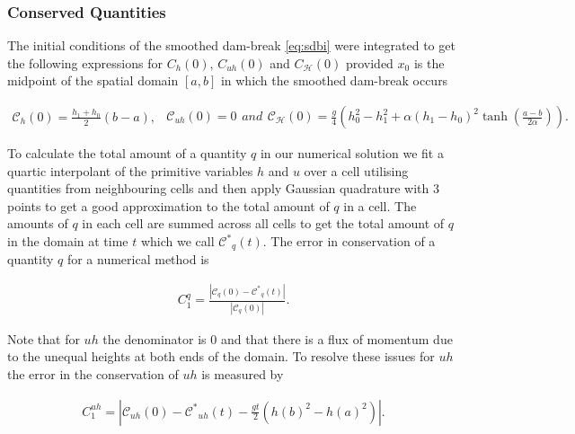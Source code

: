 \documentclass[times]{elsarticle}
\begin{document}
\subsubsection{Conserved Quantities}
The initial conditions of the smoothed dam-break \eqref{eq:sdbi} were integrated to get the following expressions for $C_{h}(0)$, $C_{uh}(0)$ and $C_{\mathcal{H}}(0)$ provided $x_0$ is the midpoint of the spatial domain $\left[a,b \right]$ in which the smoothed dam-break occurs
\begin{linenomath*}
	\begin{subequations}
		\begin{gather*}
		\mathcal{C}_{h}(0) = \frac{h_1 + h_0}{2}\left(b- a\right),
		\label{eq:Chdef}
		\end{gather*}
		\begin{gather*}
		\mathcal{C}_{uh}(0) = 0
		\label{eq:Cuhdef}
		\end{gather*}
		and
		\begin{gather*}
		\mathcal{C}_{\mathcal{H}}(0) = \frac{g}{4} \left(h_0^2 - h_1^2 + \alpha\left(h_1 - h_0\right)^2\tanh\left(\frac{a - b}{2 \alpha}\right)\right).
		\label{eq:CHdef}
		\end{gather*}
		\label{eq:Canalyticvalues}	
	\end{subequations}
\end{linenomath*}

To calculate the total amount of a quantity $q$ in our numerical solution we fit a quartic interpolant of the primitive variables $h$ and $u$ over a cell utilising quantities from neighbouring cells and then apply Gaussian quadrature with 3 points to get a good approximation to the total amount of $q$ in a cell. The amounts of $q$ in each cell are summed across all cells to get the total amount of $q$ in the domain at time $t$ which we call $\mathcal{C^*}_{q}(t)$. The error in conservation of a quantity $q$ for a numerical method is
\begin{linenomath*}
	\begin{gather}
	C_1^q = \frac{\left| \mathcal{C}_{q}(0) - \mathcal{C^*}_{q}(t) \right| }{\left|\mathcal{C}_{q}(0)\right|}.
	\end{gather}
\end{linenomath*}
Note that for $uh$ the denominator is $0$ and that there is a flux of momentum due to the unequal heights at both ends of the domain. To resolve these issues for $uh$ the error in the conservation of $uh$ is measured by
\begin{linenomath*}
	\begin{gather}
	C_1^{uh} = \left| \mathcal{C}_{uh}(0) - \mathcal{C^*}_{uh}(t) - \frac{gt}{2}\left(h(b)^2 - h(a)^2\right)\right|  .
	\label{eq:C1def}
	\end{gather}
\end{linenomath*}
\end{document}
